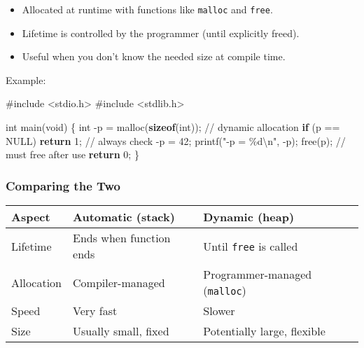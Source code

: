 \documentclass[
  letterpaper,
  DIV=11,
  numbers=noendperiod]{scrreprt}
\newenvironment{Shaded}{\begin{snugshade}}{\end{snugshade}}
\newcommand{\CommentTok}[1]{\textcolor[rgb]{0.37,0.37,0.37}{#1}}
\newcommand{\ControlFlowTok}[1]{\textcolor[rgb]{0.00,0.23,0.31}{\textbf{#1}}}
\newcommand{\DataTypeTok}[1]{\textcolor[rgb]{0.68,0.00,0.00}{#1}}
\newcommand{\DecValTok}[1]{\textcolor[rgb]{0.68,0.00,0.00}{#1}}
\newcommand{\ImportTok}[1]{\textcolor[rgb]{0.00,0.46,0.62}{#1}}
\newcommand{\KeywordTok}[1]{\textcolor[rgb]{0.00,0.23,0.31}{\textbf{#1}}}
\newcommand{\NormalTok}[1]{\textcolor[rgb]{0.00,0.23,0.31}{#1}}
\newcommand{\OperatorTok}[1]{\textcolor[rgb]{0.37,0.37,0.37}{#1}}
\newcommand{\PreprocessorTok}[1]{\textcolor[rgb]{0.68,0.00,0.00}{#1}}
\newcommand{\SpecialCharTok}[1]{\textcolor[rgb]{0.37,0.37,0.37}{#1}}
\newcommand{\StringTok}[1]{\textcolor[rgb]{0.13,0.47,0.30}{#1}}
\providecommand{\tightlist}{%
  \setlength{\itemsep}{0pt}\setlength{\parskip}{0pt}}
\begin{document}
\begin{itemize}
\tightlist
\item
  Allocated at runtime with functions like \texttt{malloc} and
  \texttt{free}.
\item
  Lifetime is controlled by the programmer (until explicitly freed).
\item
  Useful when you don't know the needed size at compile time.
\end{itemize}

Example:

\begin{Shaded}
\begin{Highlighting}[]
\PreprocessorTok{\#include }\ImportTok{\textless{}stdio.h\textgreater{}}
\PreprocessorTok{\#include }\ImportTok{\textless{}stdlib.h\textgreater{}}

\DataTypeTok{int}\NormalTok{ main}\OperatorTok{(}\DataTypeTok{void}\OperatorTok{)} \OperatorTok{\{}
    \DataTypeTok{int} \OperatorTok{{-}}\NormalTok{p }\OperatorTok{=}\NormalTok{ malloc}\OperatorTok{(}\KeywordTok{sizeof}\OperatorTok{(}\DataTypeTok{int}\OperatorTok{));}  \CommentTok{// dynamic allocation}
    \ControlFlowTok{if} \OperatorTok{(}\NormalTok{p }\OperatorTok{==}\NormalTok{ NULL}\OperatorTok{)} \ControlFlowTok{return} \DecValTok{1}\OperatorTok{;}       \CommentTok{// always check}
    \OperatorTok{{-}}\NormalTok{p }\OperatorTok{=} \DecValTok{42}\OperatorTok{;}
\NormalTok{    printf}\OperatorTok{(}\StringTok{"{-}p = }\SpecialCharTok{\%d\textbackslash{}n}\StringTok{"}\OperatorTok{,} \OperatorTok{{-}}\NormalTok{p}\OperatorTok{);}
\NormalTok{    free}\OperatorTok{(}\NormalTok{p}\OperatorTok{);}                       \CommentTok{// must free after use}
    \ControlFlowTok{return} \DecValTok{0}\OperatorTok{;}
\OperatorTok{\}}
\end{Highlighting}
\end{Shaded}

\subsubsection{Comparing the Two}\label{comparing-the-two}

\begin{longtable}[]{@{}lll@{}}
\toprule\noalign{}
Aspect & Automatic (stack) & Dynamic (heap) \\
\midrule\noalign{}
\endhead
\bottomrule\noalign{}
\endlastfoot
Lifetime & Ends when function ends & Until \texttt{free} is called \\
Allocation & Compiler-managed & Programmer-managed (\texttt{malloc}) \\
Speed & Very fast & Slower \\
Size & Usually small, fixed & Potentially large, flexible \\
\end{longtable}
\end{document}
